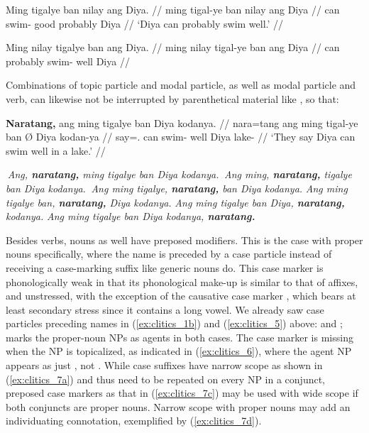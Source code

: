 \pex\label{ex:clitics_5}
\a\label{ex:clitics_5a}\begingl
	\gla Ming tigalye ban nilay ang Diya. //
	\glb ming tigal-ye ban nilay ang Diya //
	\glc can swim-\TsgF{} good probably \Aarg{} Diya //
	\glft `Diya can probably swim well.' //
\endgl

\a\label{ex:clitics_5b}\ljudge{*}\begingl
	\gla Ming nilay tigalye ban ang Diya. //
	\glb ming nilay tigal-ye ban ang Diya //
	\glc can probably swim-\TsgF{} well \Aarg{} Diya //
\endgl
\xe

Combinations of topic particle and modal particle, as well as modal particle
and verb, can likewise not be interrupted by parenthetical material like
, so that:

\pex\label{ex:clitics_6}
\a\label{ex:clitics_6a}\begingl
	\gla \textbf{Naratang,} ang ming tigalye ban {} Diya kodanya. //
	\glb nara=tang ang ming tigal-ye ban Ø Diya kodan-ya //
	\glc say=\TplM{}.\Aarg{} \AgtT{} can swim-\TsgF{} well \Top{} Diya 
		lake-\Loc{}	//
	\glft `They say Diya can swim well in a lake.' //
\endgl

\a \ljudge{*} \textit{Ang, \textbf{naratang,} ming tigalye ban Diya kodanya.}
\a \ljudge{*} \textit{Ang ming, \textbf{naratang,} tigalye ban Diya kodanya.}
\a \ljudge{\ques} \textit{Ang ming tigalye, \textbf{naratang,} ban Diya
	kodanya.}
\a \textit{Ang ming tigalye ban, \textbf{naratang,} Diya kodanya.}
\a \textit{Ang ming tigalye ban Diya, \textbf{naratang,} kodanya.}
\a \textit{Ang ming tigalye ban Diya kodanya, \textbf{naratang.}}

\xe

Besides verbs, nouns as well have preposed modifiers. This is the case with
proper nouns specifically, where the name is preceded by a case particle
instead of receiving a case-marking suffix like generic nouns do. This case
marker is phonologically weak in that its phonological make-up is similar to
that of affixes, and unstressed, with the exception of the causative case
marker , which bears at least secondary stress since it contains
a long vowel. We already saw case particles preceding names in
(\ref{ex:clitics_1b}) and (\ref{ex:clitics_5}) above:  and ;   marks the proper-noun NPs
as agents in both cases. The case marker is missing when the NP is topicalized,
as indicated in (\ref{ex:clitics_6}), where the agent NP appears as just
, not . While case suffixes have narrow
scope as shown in (\ref{ex:clitics_7a}) and thus need to be repeated on every
NP in a conjunct, preposed case markers as that in (\ref{ex:clitics_7c}) may be
used with wide scope if both conjuncts are proper nouns. Narrow scope with
proper nouns may add an individuating connotation, exemplified by
(\ref{ex:clitics_7d}).

